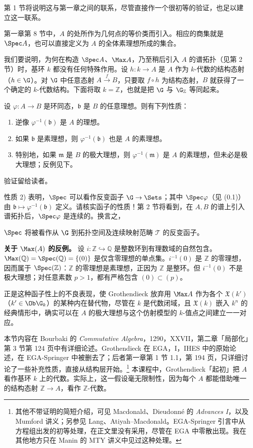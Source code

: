 第 1 节将说明这与第一章之间的联系，尽管直接作一个很初等的验证，也足以建立这一联系。

第一章第 8 节中，$A$ 的处所作为几何点的等价类而引入。相应的商集就是 $\Spec A$，也可以直接定义为 $A$ 的全体素理想所成的集合。

我们要说明，为何在构造 $\Spec A$、$\Max A$，乃至稍后引入 $A$ 的谱拓扑（见第 2 节）时，基环 $k$ 都没有任何特殊作用。设 $h:k\to A$ 是 $A$ 作为 $k$-代数的结构态射（$h\in\G$）。对 $\G$ 中任意态射 $A\xrightarrow f B$，只要取 $f\circ h$ 为结构态射，$B$ 就获得了一个确定的 $k$-代数结构。下面将取 $k=\mathbb Z$，也就是把 $\G$ 与 $\G_{\mathbb Z}$ 等同起来。

设 $\varphi:A\to B$ 是环同态，$\mathfrak b$ 是 $B$ 的任意理想。则有下列性质：
\begin{enumerate}[label=\arabic*)]
\item 逆像 $\varphi^{-1}(\mathfrak b)$ 是 $A$ 的理想。
\item 如果 $\mathfrak b$ 是素理想，则 $\varphi^{-1}(\mathfrak b)$ 也是 $A$ 的素理想。
\item 特别地，如果 $\mathfrak m$ 是 $B$ 的极大理想，则 $\varphi^{-1}(\mathfrak m)$ 是 $A$ 的素理想，但未必是极大理想；反例见下。
\end{enumerate}
验证留给读者。

性质 2) 表明，$\Spec$ 可以看作反变函子 $\G\to\Sets$；其中 $\Spec\varphi$（见 (0.1)）由 $\mathfrak b\mapsto\varphi^{-1}(\mathfrak b)$ 定义。请核实函子的性质！第 2 节将看到，在 $A,B$ 的谱上引入谱拓扑后，$\Spec\varphi$ 是连续的。换言之，

$\Spec$ 将被看作从 $\G$ 到拓扑空间及连续映射范畴 $\mathcal T$ 的反变函子。

\textbf{关于 $\Max(A)$ 的反例。} 设 $i:\mathbb Z\hookrightarrow\mathbb Q$ 是整数环到有理数域的自然包含。$\Max(\mathbb Q)=\Spec(\mathbb Q)=\{(0)\}$ 是仅含零理想的单点集。$i^{-1}(0)$ 是 $\mathbb Z$ 的零理想，因而属于 $\Spec(\mathbb Z)$：$\mathbb Z$ 的零理想是素理想，正因为 $\mathbb Z$ 是整环。但 $i^{-1}(0)$ 不是极大理想；对任意素数 $p>1$，都有严格包含 $(0)\subset(p)$。

正是这种函子性上的不良表现，使 Grothendieck 放弃用 $\Max A$ 作为各个 $\mathfrak X(k')$（$k'\in\Ob\G_k$）的某种内在替代物，尽管在 $k$ 是代数闭域，且 $\mathfrak X(k)$ 嵌入 $k^n$ 的经典情形中，确实可以在 $A$ 的极大理想与这个仿射模型的 $k$-值点之间建立一一对应。

本节内容在 Bourbaki 的 \textit{Commutative Algebra}，1290，XXVII，第二章「局部化」第 3 节第 124 页中有详细论述。Grothendieck 在 EGA，I，IHES 中的原始论述，在 EGA-Springer 中被删去了；后者第一章第 1 节 1.1，第 194 页，只详细讨论了一些补充性质，直接从结构层开始。\footnote{其他不带证明的简短介绍，可见 Macdonald、Dieudonné 的 \textit{Advances I}，以及 Mumford 讲义；另参见 Lang、Atiyah--Macdonald。EGA-Springer 引言中从方程组出发的初等处理，在正文里没有采用，尽管在 EGA 中零散出现。我在其他地方只在 Manin 的 MTY 讲义中见过这种处理。}
本课程中，Grothendieck「起初」把 $A$ 看作基环 $k$ 上的代数。实际上，这一假设毫无限制性，因为每个 $A$ 都能借助唯一的结构态射 $\mathbb Z\to A$，看作 $\mathbb Z$-代数。

